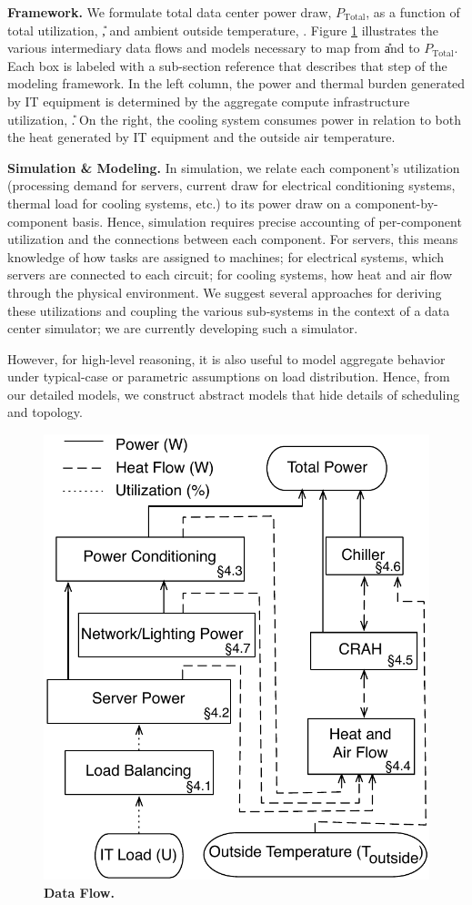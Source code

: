 {\bf Framework.}  We formulate total data center power draw, $P_{\mathrm{Total}}$, as a function of total utilization, \U, and ambient outside temperature, \Toutside.  Figure \ref{figure::DataFlow} illustrates the various intermediary data flows and models necessary to map from \U and \Toutside to $P_{\mathrm{Total}}$. Each box is labeled with a sub-section reference that describes that step of the modeling framework.  In the left column, the power and thermal burden generated by IT equipment is determined by the aggregate compute infrastructure utilization, \U.  On the right, the cooling system consumes power in relation to both the heat generated by IT equipment and the outside air temperature.


{\bf Simulation \& Modeling.} In simulation, we relate each component's utilization (processing demand for servers, current draw for electrical conditioning systems, thermal load for cooling systems, etc.) to its power draw on a component-by-compo\-nent basis.  Hence, simulation requires precise accounting of per-component utilization and the connections between each component.  For servers, this means knowledge of how tasks are assigned to machines; for electrical systems, which servers are connected to each circuit; for cooling systems, how heat and air flow through the physical environment.  We suggest several approaches for deriving these utilizations and coupling the various sub-systems in the context of a data center simulator; we are currently developing such a simulator.

However, for high-level reasoning, it is also useful to model aggregate behavior under typical-case or parametric assumptions on load distribution. Hence, from our detailed models, we construct abstract models that hide details of scheduling and topology.

\begin{figure}[t!]
\centering
\includegraphics[width = 3 in]{Appendices/WEED/figure/Dependencies.pdf}
\caption{ \textbf{Data Flow.} }
\label{figure::DataFlow}
\end{figure}

